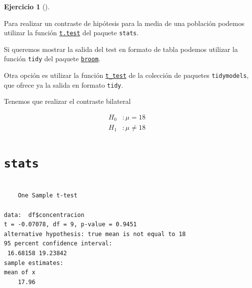 \documentclass[
  a4paper,
]{scrreport}
\newenvironment{Shaded}{\begin{snugshade}}{\end{snugshade}}
\newcommand{\AttributeTok}[1]{\textcolor[rgb]{0.40,0.45,0.13}{#1}}
\newcommand{\DecValTok}[1]{\textcolor[rgb]{0.68,0.00,0.00}{#1}}
\newcommand{\FunctionTok}[1]{\textcolor[rgb]{0.28,0.35,0.67}{#1}}
\newcommand{\NormalTok}[1]{\textcolor[rgb]{0.00,0.23,0.31}{#1}}
\newcommand{\SpecialCharTok}[1]{\textcolor[rgb]{0.37,0.37,0.37}{#1}}
\theoremstyle{definition}
\newtheorem{exercise}{Ejercicio}[chapter]
\theoremstyle{remark}
\begin{document}
\begin{exercise}[]
\begin{enumerate}
\begin{tcolorbox}
  Para realizar un contraste de hipótesis para la media de una población
  podemos utilizar la función
  \href{https://www.rdocumentation.org/packages/stats/versions/3.6.2/topics/t.test}{\texttt{t.test}}
  del paquete \texttt{stats}.

  Si queremos mostrar la salida del test en formato de tabla podemos
  utilizar la función \texttt{tidy} del paquete
  \href{https://broom.tidymodels.org/index.html}{\texttt{broom}}.

  Otra opción es utilizar la función
  \href{https://infer.tidymodels.org/reference/t_test.html}{\texttt{t\_test}}
  de la colección de paquetes \texttt{tidymodels}, que ofrece ya la
  salida en formato \texttt{tidy}.

  \end{tcolorbox}

  \begin{tcolorbox}[enhanced jigsaw, breakable, toptitle=1mm, colbacktitle=quarto-callout-tip-color!10!white, rightrule=.15mm, opacityback=0, opacitybacktitle=0.6, titlerule=0mm, coltitle=black, colframe=quarto-callout-tip-color-frame, colback=white, bottomtitle=1mm, leftrule=.75mm, toprule=.15mm, title=\textcolor{quarto-callout-tip-color}{\faLightbulb}\hspace{0.5em}{Solución}, arc=.35mm, bottomrule=.15mm, left=2mm]

  Tenemos que realizar el contraste bilateral

  \begin{align*}
  H_0 &: \mu=18\\
  H_1 &: \mu\neq 18 
  \end{align*}

  \section{\texorpdfstring{\texttt{stats}}{stats}}

\begin{Shaded}
\end{Shaded}

\begin{verbatim}

    One Sample t-test

data:  df$concentracion
t = -0.07078, df = 9, p-value = 0.9451
alternative hypothesis: true mean is not equal to 18
95 percent confidence interval:
 16.68158 19.23842
sample estimates:
mean of x 
    17.96 
\end{verbatim}


\end{tcolorbox}
\end{enumerate}
\end{exercise}
\end{document}
